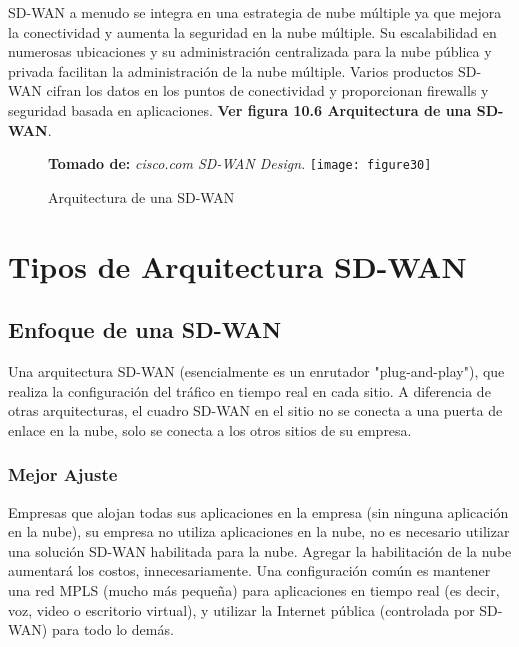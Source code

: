SD-WAN a menudo se integra en una estrategia de nube múltiple ya que mejora la conectividad y aumenta la seguridad en la nube múltiple. Su escalabilidad en numerosas ubicaciones y su administración centralizada para la nube pública y privada facilitan la administración de la nube múltiple. Varios productos SD-WAN cifran los datos en los puntos de conectividad y proporcionan firewalls y seguridad basada en aplicaciones.
\textbf{Ver figura 10.6 Arquitectura de una SD-WAN}.

\begin{figure}[htbp]
 \footnotesize{\textbf{Tomado de:} \textit{cisco.com SD-WAN Design}.}
  \centering
    {\texttt{[image: figure30]}}%
  \caption{\footnotesize{Arquitectura de una SD-WAN}}
  \label{fig:fig2subfig}
\end{figure}


\section{Tipos de Arquitectura SD-WAN}
\label{sec:Tipos de Arquitectura SD-WAN}

\subsection{Enfoque de una SD-WAN}
\label{sec:Enfoque de una SD-WAN}

Una arquitectura SD-WAN (esencialmente es un enrutador "plug-and-play"), que realiza
la configuración del tráfico en tiempo real en cada sitio. A diferencia de otras arquitecturas, el cuadro SD-WAN en el sitio no se conecta a una puerta de enlace en la nube, solo se conecta a los otros sitios de su empresa.

\subsubsection{Mejor Ajuste}
\label{sec:Mejor Ajuste}

Empresas que alojan todas sus aplicaciones en la empresa (sin ninguna aplicación en la nube), su empresa no utiliza aplicaciones en la nube, no es necesario utilizar una solución SD-WAN habilitada para la nube. Agregar la habilitación de la nube aumentará los costos, innecesariamente. Una configuración común es mantener una red MPLS (mucho más pequeña) para aplicaciones en tiempo real (es decir, voz, video o escritorio virtual), y utilizar la Internet pública (controlada por SD-WAN) para todo lo demás.


